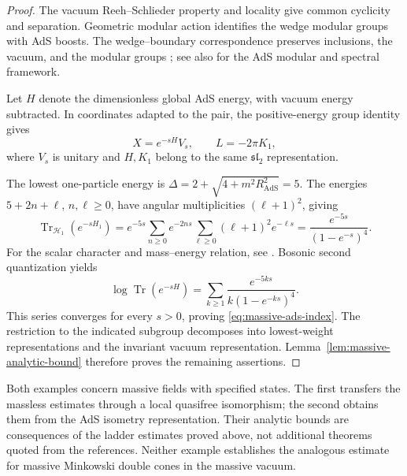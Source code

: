 \documentclass[a4paper,11pt]{article}
\theoremstyle{definition}
\begin{document}
\begin{proof}
The vacuum Reeh--Schlieder property and locality give common cyclicity and
separation. Geometric modular action identifies the wedge modular groups
with AdS boosts. The wedge--boundary correspondence preserves inclusions,
the vacuum, and the modular groups \cite{Rehren2000}; see also
\cite{BS2004} for the AdS modular and spectral framework.

Let $H$ denote the dimensionless global AdS energy, with vacuum energy
subtracted. In coordinates adapted to the pair, the positive-energy group
identity \cite[Proposition~3.1]{BDL2007} gives
\[
 X=e^{-sH}V_s,\qquad L=-2\pi K_1,
\]
where $V_s$ is unitary and $H,K_1$ belong to the same
$\mathfrak{sl}_2$ representation.

The lowest one-particle energy is
$\Delta=2+\sqrt{4+m^2R_{\mathrm{AdS}}^2}=5$.
The energies $5+2n+\ell$, $n,\ell\ge0$, have angular multiplicities
$(\ell+1)^2$, giving
\[
 \operatorname{Tr}_{\mathcal H_1}(e^{-sH_1})
 =e^{-5s}\sum_{n\ge0}e^{-2ns}
   \sum_{\ell\ge0}(\ell+1)^2e^{-\ell s}
 =\frac{e^{-5s}}{(1-e^{-s})^4}.
\]
For the scalar character and mass--energy relation, see \cite{KMS2020}.
Bosonic second quantization yields
\[
 \log\operatorname{Tr}(e^{-sH})
 =\sum_{k\ge1}\frac{e^{-5ks}}{k(1-e^{-ks})^4}.
\]
This series converges for every $s>0$, proving
\eqref{eq:massive-ads-index}. The restriction to the indicated subgroup
decomposes into lowest-weight representations and the invariant vacuum
representation. Lemma~\ref{lem:massive-analytic-bound} therefore proves
the remaining assertions.
\end{proof}

Both examples concern massive fields with specified states. The first
transfers the massless estimates through a local quasifree isomorphism;
the second obtains them from the AdS isometry representation. Their analytic
bounds are consequences of the ladder estimates proved above, not additional
theorems quoted from the references. Neither example establishes the analogous
estimate for massive Minkowski double cones in the massive vacuum.




\end{document}
